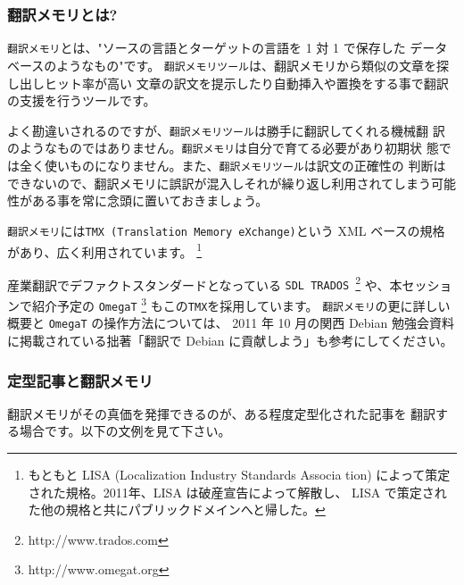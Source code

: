 \documentclass[mingoth,a4paper]{jsarticle}
\begin{document}
\subsubsection{翻訳メモリとは?}
{\tt 翻訳メモリ}とは、"ソースの言語とターゲットの言語を 1 対 1 で保存した
データベースのようなもの"です。
{\tt 翻訳メモリツール}は、翻訳メモリから類似の文章を探し出しヒット率が高い
文章の訳文を提示したり自動挿入や置換をする事で翻訳の支援を行うツールです。

よく勘違いされるのですが、{\tt 翻訳メモリツール}は勝手に翻訳してくれる機械翻
訳のようなものではありません。{\tt 翻訳メモリ}は自分で育てる必要があり初期状
態では全く使いものになりません。また、{\tt 翻訳メモリツール}は訳文の正確性の
判断はできないので、翻訳メモリに誤訳が混入しそれが繰り返し利用されてしまう可能
性がある事を常に念頭に置いておきましょう。

{\tt 翻訳メモリ}には{\tt TMX (Translation Memory eXchange)}という
XML ベースの規格があり、広く利用されています。
\footnote{もともと LISA (Localization Industry Standards Associa
	tion) によって策定された規格。2011年、LISA は破産宣告によって解散し、
	LISA で策定された他の規格と共にパブリックドメインへと帰した。}

産業翻訳でデファクトスタンダードとなっている
{\tt SDL TRADOS \textregistered}\footnote{http://www.trados.com}
や、本セッションで紹介予定の {\tt OmegaT}
\footnote{http://www.omegat.org} もこの{\tt TMX}を採用しています。
{\tt 翻訳メモリ}の更に詳しい概要と {\tt OmegaT} の操作方法については、
2011 年 10 月の関西 Debian 勉強会資料に掲載されている拙著「翻訳で Debian
に貢献しよう」も参考にしてください。

\subsubsection{定型記事と翻訳メモリ}
翻訳メモリがその真価を発揮できるのが、ある程度定型化された記事を
翻訳する場合です。以下の文例を見て下さい。
\end{document}
